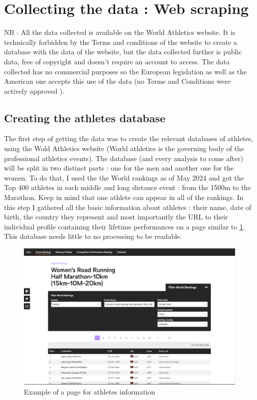 \documentclass[10pt, a4paper]{article}
\begin{document}
\section{Collecting the data : Web scraping}

NB : All the data collected is available on the World Athletics website. It is technically forbidden by the Terms and conditions of the website to create a database with the data of the website, but the data collected further is public data, free of copyright and doesn't require an account to access. The data collected has no commercial purposes so the European legislation as well as the American one accepts this use of the data (no Terms and Conditions were actively approved ).

\subsection*{Creating the athletes database}

The first step of getting the data was to create the relevant databases of athletes, using the Wold Athletics website (World athletics is the governing body of the professional athletics events). The database (and every analysis to come after) will be split in two distinct parts : one for the men and another one for the women.
To do that, I used the the World rankings as of May 2024 and got the Top 400 athletes in each middle and long distance event : from the 1500m to the Marathon. Keep in mind that one athlete can appear in all of the rankings. In this step I gathered all the basic information about athletes : their name, date of birth, the country they represent and most importantly the URL to their individual profile containing their lifetime performances on a page similar to \ref{fig:athl-scrap}. This database needs little to no processing to be readable.

\begin{figure}
    \centering
    \includegraphics[width=0.5\linewidth]{Data/Figure_for_report/Athlete Scraping.png}
    \caption{Example of a page for athletes information}
    \label{fig:athl-scrap}
\end{figure}
\end{document}
